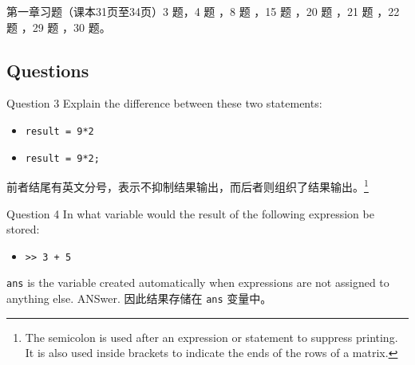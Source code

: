 第一章习题（课本31页至34页）3 题，4 题 ，8 题 ，15 题 ，20 题 ，21 题 ，22 题 ，29 题 ，30 题。

\subsection{Questions}
\begin{statebox}{Question 3}{}
    Explain the difference between these two statements:
    \begin{itemize}
        \item \verb|result = 9*2|
        \item \verb|result = 9*2;|
    \end{itemize}
\end{statebox}
前者结尾有英文分号，表示不抑制结果输出，而后者则组织了结果输出。\footnote{The semicolon is used after an expression or statement to suppress printing. It is also used inside brackets to indicate the ends of the rows of a matrix.}


\begin{statebox}{Question 4}{}
    In what variable would the result of the following expression be stored:
    \begin{itemize}
        \item \verb|>> 3 + 5|
    \end{itemize}
\end{statebox}
\verb|ans| is the variable created automatically when expressions are not assigned to anything else. ANSwer. 因此结果存储在 \verb|ans| 变量中。


